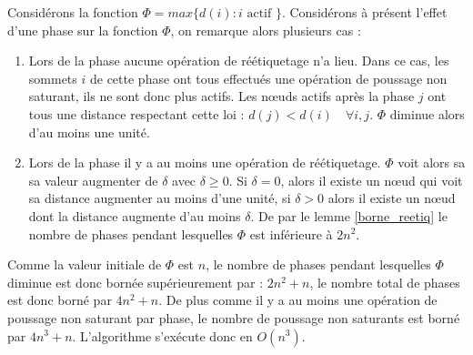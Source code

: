 Considérons la fonction $\Phi = max \{d(i) : i \mbox{ actif }\}$. Considérons à présent l'effet
d'une phase sur la fonction $\Phi$, on remarque alors plusieurs cas :
\begin{enumerate}
	\item Lors de la phase aucune opération de réétiquetage n'a lieu. Dans ce cas, les sommets $i$ de
		cette phase ont tous effectués une opération de poussage non saturant, ils ne sont donc plus
		actifs. Les n\oe uds actifs après la phase $j$ ont tous une distance respectant cette loi : $d(j)
		< d(i) \quad \forall i, j$. $\Phi$ diminue alors d'au moins une unité.
	\item Lors de la phase il y a au moins une opération de réétiquetage. $\Phi$ voit alors sa sa
		valeur augmenter de $\delta$ avec $\delta \geq 0$. Si $\delta = 0$, alors il existe un n\oe ud qui
		voit sa distance augmenter au moins d'une unité, si $\delta > 0$ alors il existe un n\oe ud dont la
		distance augmente d'au moins $\delta$. De par le lemme \ref{borne_reetiq} le nombre de phases
		pendant lesquelles $\Phi$ est inférieure à $2n^2$.
\end{enumerate}
Comme la valeur initiale de $\Phi$ est $n$, le nombre de phases pendant lesquelles $\Phi$ diminue
est donc bornée supérieurement par : $2n^2 + n$, le nombre total de phases est donc borné par $4n^2
+ n$. De plus comme il y a au moins une opération de poussage non saturant par phase, le nombre de
poussage non saturants est borné par $4n^3 + n$. L'algorithme s'exécute donc en $O(n^3)$.
